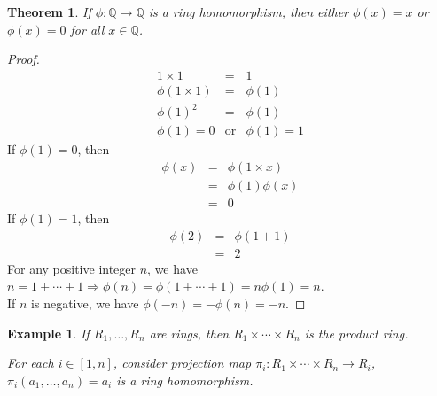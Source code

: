 \documentclass{article}
\theoremstyle{MyNonumberplain}
\theoremstyle{break}
\newtheorem*{proof}{Proof. }
\newcommand{\tmop}{\text}
\theoremstyle{break}
\newtheorem{theorem}{Theorem}[section]
\newtheorem{example}{Example}[section]
\theoremstyle{break}
\theoremstyle{definition}
\theoremstyle{break}
\begin{document}
\begin{thmbox}
    \begin{theorem}
        If $\phi : \mathbb{Q} \rightarrow \mathbb{Q}$ is a ring homomorphism, then
        either $\phi (x) = x$ or $\phi (x) = 0$ for all $x \in \mathbb{Q}$.
    \end{theorem}
    \begin{prfbox}
        \begin{proof}
            \begin{eqnarray*}
                1 \times 1 & = & 1\\
                \phi (1 \times 1) & = & \phi (1)\\
                \phi (1)^2 & = & \phi (1)\\
                \phi (1) = 0 & \tmop{or} & \phi (1) = 1
              \end{eqnarray*}
              If $\phi (1) = 0$, then
              \begin{eqnarray*}
                \phi (x) & = & \phi (1 \times x)\\
                & = & \phi (1) \phi (x)\\
                & = & 0
              \end{eqnarray*}
              If $\phi (1) = 1$, then
              \begin{eqnarray*}
                \phi (2) & = & \phi (1 + 1)\\
                & = & 2
              \end{eqnarray*}
              For any positive integer $n$, we have $n = 1 + \cdots + 1 \Rightarrow \phi (n)
              = \phi (1 + \cdots + 1) = n \phi (1) = n$.\\
              
              If $n$ is negative, we have $\phi (- n) = - \phi (n) = - n$.
        \end{proof}
    \end{prfbox}
\end{thmbox}

\begin{expbox}
    \begin{example}
        If $R_1, \ldots, R_n$ are rings, then $R_1 \times \cdots \times R_n$ is the
        product ring.
        
        For each $i \in [1, n]$, consider projection map $\pi_i : R_1 \times \cdots
        \times R_n \rightarrow R_i$, $\pi_i (a_1, \ldots, a_n) = a_i$ is a ring
        homomorphism.
    \end{example}
\end{expbox}
\end{document}
